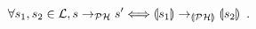 \begin{theorem}[$\PH \approx \phmtophp$]
  \[\forall s_1, s_2 \in \PHl, s \PHtrans s' \Longleftrightarrow
    \tophp{s_1} \trans{\phmtophp} \tophp{s_2} \enspace.\]
\end{theorem}




